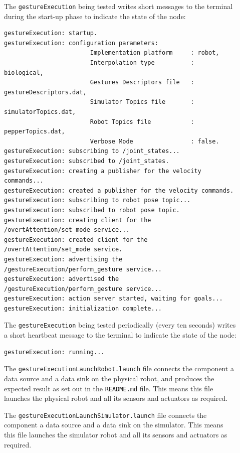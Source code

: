 \documentclass{CSSRforAfrica}
\newcommand{\checkboxChecked}{\fbox{\ding{51}}} %
\newcommand{\checkboxDashed}{\fbox{--}}         %
\begin{document}
\begin{description}
\item[\checkboxChecked]  The {\small \verb+gestureExecution+} being tested writes short messages to the terminal during the start-up phase to
 indicate the state of the node:
\begin{verbatim}
gestureExecution: startup.
gestureExecution: configuration parameters:
                        Implementation platform		: robot, 
                        Interpolation type		    : biological,                 
                        Gestures Descriptors file	: gestureDescriptors.dat, 
                        Simulator Topics file		: simulatorTopics.dat,                 
                        Robot Topics file		    : pepperTopics.dat, 
                        Verbose Mode			    : false.
gestureExecution: subscribing to /joint_states...
gestureExecution: subscribed to /joint_states.
gestureExecution: creating a publisher for the velocity commands...
gestureExecution: created a publisher for the velocity commands.
gestureExecution: subscribing to robot pose topic...
gestureExecution: subscribed to robot pose topic.
gestureExecution: creating client for the /overtAttention/set_mode service...
gestureExecution: created client for the /overtAttention/set_mode service.
gestureExecution: advertising the /gestureExecution/perform_gesture service...
gestureExecution: advertised the /gestureExecution/perform_gesture service...
gestureExecution: action server started, waiting for goals...
gestureExecution: initialization complete...
\end{verbatim}

\item[\checkboxChecked]  The {\small \verb+gestureExecution+} being tested periodically (every ten seconds) writes a short heartbeat message to
 the terminal to indicate the state of the node:
\begin{verbatim}
gestureExecution: running...
\end{verbatim}

\item[\checkboxDashed] The {\small \verb+gestureExecutionLaunchRobot.launch+} file  connects the component a data source and a data sink on the physical robot, and produces the expected result as set out in the  {\small \verb+README.md+}  file.    This means this file launches the physical robot and all its sensors and actuators as required.

\item[\checkboxDashed] The {\small \verb+gestureExecutionLaunchSimulator.launch+} file  connects the component a data source and a data sink on the simulator.   This means this file launches the simulator robot and all its sensors and actuators as required.


\end{description}
\end{document}
